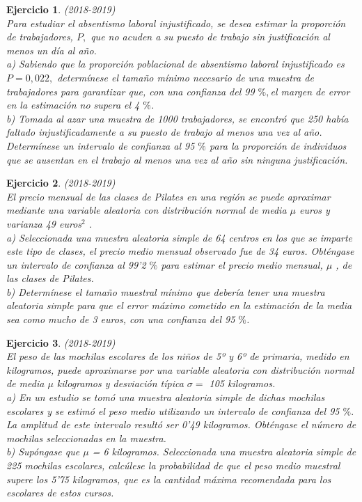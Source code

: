 \documentclass[12pt, a4paper]{amsart}
\newtheorem{ejer}{Ejercicio}
\begin{document}
\begin{ejer}\em (2018-2019)\\
Para estudiar el absentismo laboral injustificado, se desea estimar la proporción de trabajadores, $P,$ que no
acuden a su puesto de trabajo sin justificación al menos un día al año.\\
a) Sabiendo que la proporción poblacional de absentismo laboral injustificado es $P = 0,022,$ determínese el
tamaño mínimo necesario de una muestra de trabajadores para garantizar que, con una confianza del 99 $\%,$el
margen de error en la estimación no supera el 4 $\%$. \\
b) Tomada al azar una muestra de 1000 trabajadores, se encontró que 250 había faltado injustificadamente a
su puesto de trabajo al menos una vez al año. Determínese un intervalo de confianza al 95 $\%$ para la proporción
de individuos que se ausentan en el trabajo al menos una vez al año sin ninguna justificación.
\end{ejer}

\begin{ejer}\em (2018-2019)\\
El precio mensual de las clases de Pilates en una región se puede aproximar mediante una variable aleatoria
con distribución normal de media $\mu$ euros y varianza 49 euros$^2$ .\\
a) Seleccionada una muestra aleatoria simple de 64 centros en los que se imparte este tipo de clases, el precio
medio mensual observado fue de 34 euros. Obténgase un intervalo de confianza al 99’2 $\%$ para estimar el precio
medio mensual, $\mu$ , de las clases de Pilates.\\
b) Determínese el tamaño muestral mínimo que debería tener una muestra aleatoria simple para que el error
máximo cometido en la estimación de la media sea como mucho de 3 euros, con una confianza del 95 $\%$. 
\end{ejer}

\begin{ejer}\em (2018-2019)\\
El peso de las mochilas escolares de los niños de 5º y 6º de primaria, medido en kilogramos, puede aproximarse
por una variable aleatoria con distribución normal de media $\mu$ kilogramos y desviación típica  $\sigma =$ 105 kilogramos.\\
a) En un estudio se tomó una muestra aleatoria simple de dichas mochilas escolares y se estimó el peso
medio utilizando un intervalo de confianza del 95 $\%.$La amplitud de este intervalo resultó ser 0’49 kilogramos.
Obténgase el número de mochilas seleccionadas en la muestra.\\
b) Supóngase que $\mu$ = 6 kilogramos. Seleccionada una muestra aleatoria simple de 225 mochilas escolares,
calcúlese la probabilidad de que el peso medio muestral supere los 5’75 kilogramos, que es la cantidad máxima
recomendada para los escolares de estos cursos.
\end{ejer}
\end{document}
